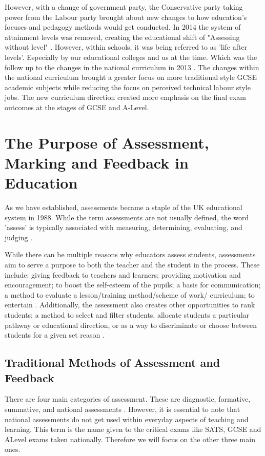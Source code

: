 	However, with a change of government party, the Conservative party taking power from the Labour party brought about new changes to how education's focuses and pedagogy methods would get conducted. In 2014 the system of attainment levels was removed, creating the educational shift of "Assessing without level" \cite{ass_without_lvls}. However, within schools, it was being referred to as 'life after levels'. Especially by our educational colleges and us at the time. Which was the follow up to the changes in the national curriculum in 2013 \cite{ass_without_lvls}. The changes within the national curriculum brought a greater focus on more traditional style GCSE academic subjects while reducing the focus on perceived technical labour style jobs. The new curriculum direction created more emphasis on the final exam outcomes at the stages of GCSE and A-Level.
	
	\section{The Purpose of Assessment, Marking and Feedback in Education}
		As we have established, assessments became a staple of the UK educational system in 1988. While the term assessments are not usually defined, the word 'assess' is typically associated with measuring, determining, evaluating, and judging \cite{wellington2007secondary}.
		
		While there can be multiple reasons why educators assess students, assessments aim to serve a purpose to both the teacher and the student in the process. These include: giving feedback to teachers and learners; providing motivation and encouragement; to boost the self-esteem of the pupils; a basis for communication; a method to evaluate a lesson/training method/scheme of work/ curriculum; to entertain \cite{wellington2007secondary}. Additionally, the assessment also creates other opportunities to rank students; a method to select and filter students, allocate students a particular pathway or educational direction, or as a way to discriminate or choose between students for a given set reason \cite{wellington2007secondary}.
	
	\subsection{Traditional Methods of Assessment and Feedback} %
		There are four main categories of assessment. These are diagnostic, formative, summative, and national assessments \cite{wellington2007secondary, dillon2011becoming}. However, it is essential to note that national assessments do not get used within everyday aspects of teaching and learning. This term is the name given to the critical exams like SATS, GCSE and ALevel exams taken nationally. Therefore we will focus on the other three main ones.
	
